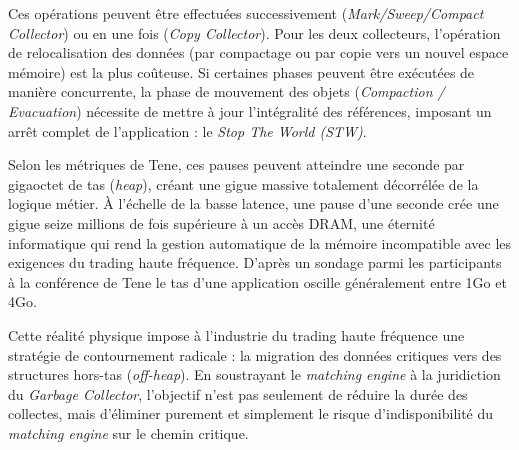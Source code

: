 Ces opérations peuvent être effectuées successivement (\textit{Mark/Sweep/Compact Collector}) ou en une fois (\textit{Copy Collector}). Pour les deux collecteurs, l'opération de relocalisation des données (par compactage ou par copie vers un nouvel espace mémoire) est la plus coûteuse. Si certaines phases peuvent être exécutées de manière concurrente, la phase de mouvement des objets (\textit{Compaction / Evacuation}) nécessite de mettre à jour l'intégralité des références, imposant un arrêt complet de l'application : le \textit{Stop The World (STW)}.

Selon les métriques de Tene, ces pauses peuvent atteindre une seconde par gigaoctet de tas (\textit{heap}), créant une gigue massive totalement décorrélée de la logique métier. À l'échelle de la basse latence, une pause d'une seconde crée une gigue seize millions de fois supérieure à un accès DRAM, une éternité informatique qui rend la gestion automatique de la mémoire incompatible avec les exigences du trading haute fréquence. D'après un sondage parmi les participants à la conférence de Tene le tas d'une application oscille généralement entre 1Go et 4Go.

Cette réalité physique impose à l'industrie du trading haute fréquence une stratégie de contournement radicale : la migration des données critiques vers des structures hors-tas (\textit{off-heap}). En soustrayant le \textit{matching engine} à la juridiction du \textit{Garbage Collector}, l'objectif n'est pas seulement de réduire la durée des collectes, mais d'éliminer purement et simplement le risque d'indisponibilité du \textit{matching engine} sur le chemin critique.